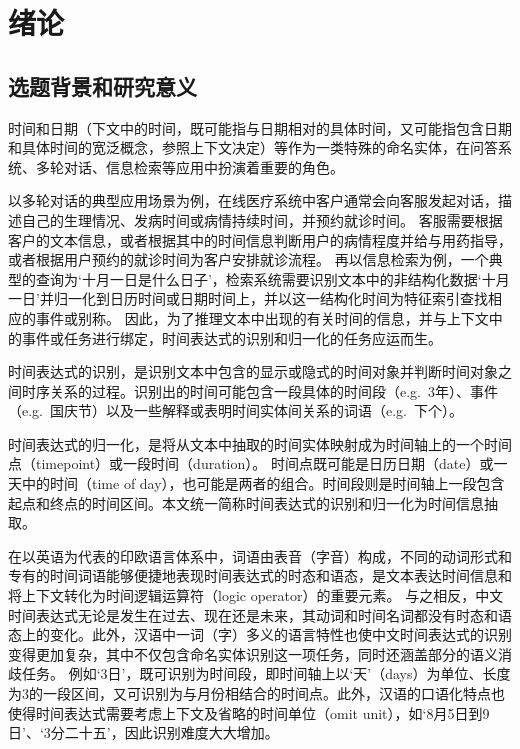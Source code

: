 
\chapter{绪论}

\section{选题背景和研究意义}

时间和日期（下文中的时间，既可能指与日期相对的具体时间，又可能指包含日期和具体时间的宽泛概念，参照上下文决定）等作为一类特殊的命名实体，在问答系统、多轮对话、信息检索等应用中扮演着重要的角色。

以多轮对话的典型应用场景为例，在线医疗系统中客户通常会向客服发起对话，描述自己的生理情况、发病时间或病情持续时间，并预约就诊时间。
客服需要根据客户的文本信息，或者根据其中的时间信息判断用户的病情程度并给与用药指导，或者根据用户预约的就诊时间为客户安排就诊流程。
再以信息检索为例，一个典型的查询为‘十月一日是什么日子’，检索系统需要识别文本中的非结构化数据‘十月一日’并归一化到日历时间或日期时间上，并以这一结构化时间为特征索引查找相应的事件或别称。
因此，为了推理文本中出现的有关时间的信息，并与上下文中的事件或任务进行绑定，时间表达式的识别和归一化的任务应运而生。

时间表达式的识别，是识别文本中包含的显示或隐式的时间对象并判断时间对象之间时序关系的过程。识别出的时间可能包含一段具体的时间段（e.g.\ 3年）、事件（e.g.\ 国庆节）以及一些解释或表明时间实体间关系的词语（e.g.\ 下个）。

时间表达式的归一化，是将从文本中抽取的时间实体映射成为时间轴上的一个时间点（timepoint）或一段时间（duration）。
时间点既可能是日历日期（date）或一天中的时间（time of day），也可能是两者的组合。时间段则是时间轴上一段包含起点和终点的时间区间。本文统一简称时间表达式的识别和归一化为时间信息抽取。

在以英语为代表的印欧语言体系中，词语由表音（字音）构成，不同的动词形式和专有的时间词语能够便捷地表现时间表达式的时态和语态，是文本表达时间信息和将上下文转化为时间逻辑运算符（logic operator）的重要元素。
与之相反，中文时间表达式无论是发生在过去、现在还是未来，其动词和时间名词都没有时态和语态上的变化。此外，汉语中一词（字）多义的语言特性也使中文时间表达式的识别变得更加复杂，其中不仅包含命名实体识别这一项任务，同时还涵盖部分的语义消歧任务。
例如‘3日’，既可识别为时间段，即时间轴上以‘天’（days）为单位、长度为3的一段区间，又可识别为与月份相结合的时间点。此外，汉语的口语化特点也使得时间表达式需要考虑上下文及省略的时间单位（omit unit），如‘8月5日到9日’、‘3分二十五’，因此识别难度大大增加。

